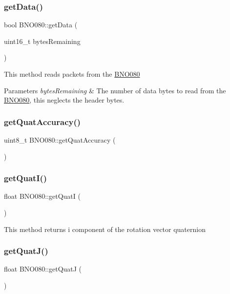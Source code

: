 \subsubsection{\texorpdfstring{getData()}{getData()}}
{\footnotesize\ttfamily bool B\+N\+O080\+::get\+Data (\begin{DoxyParamCaption}\item[{uint16\+\_\+t}]{bytes\+Remaining }\end{DoxyParamCaption})}

This method reads packets from the \mbox{\hyperlink{classBNO080}{B\+N\+O080}} 
\begin{DoxyParams}{Parameters}
{\em bytes\+Remaining} & The number of data bytes to read from the \mbox{\hyperlink{classBNO080}{B\+N\+O080}}, this neglects the header bytes. \\
\hline
\end{DoxyParams}
\mbox{\label{classBNO080_a35edcb9c8ffa4919d143472532ea7956}} 
\subsubsection{\texorpdfstring{getQuatAccuracy()}{getQuatAccuracy()}}
{\footnotesize\ttfamily uint8\+\_\+t B\+N\+O080\+::get\+Quat\+Accuracy (\begin{DoxyParamCaption}{ }\end{DoxyParamCaption})}

\mbox{\label{classBNO080_aa75bbd109ac767de5d588ad1151322c8}} 
\subsubsection{\texorpdfstring{getQuatI()}{getQuatI()}}
{\footnotesize\ttfamily float B\+N\+O080\+::get\+QuatI (\begin{DoxyParamCaption}{ }\end{DoxyParamCaption})}

This method returns i component of the rotation vector quaternion \mbox{\label{classBNO080_a2ca55d6200af2629d1d80e6c5577cb63}} 
\subsubsection{\texorpdfstring{getQuatJ()}{getQuatJ()}}
{\footnotesize\ttfamily float B\+N\+O080\+::get\+QuatJ (\begin{DoxyParamCaption}{ }\end{DoxyParamCaption})}

